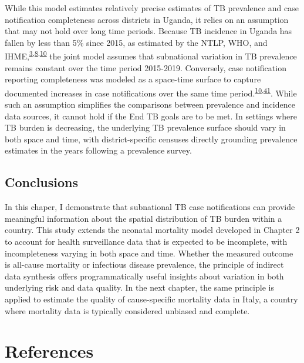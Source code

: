 \documentclass[
]{article}
\begin{document}
While this model estimates relatively precise estimates of TB prevalence and case notification completeness across districts in Uganda, it relies on an assumption that may not hold over long time periods. Because TB incidence in Uganda has fallen by less than 5\% since 2015, as estimated by the NTLP, WHO, and IHME,\textsuperscript{\protect\hyperlink{ref-WorldHealthOrganization2019}{3},\protect\hyperlink{ref-Kyu2018}{8},\protect\hyperlink{ref-UgandaNationalTuberculosisandLeprosyProgramme2020}{10}} the joint model assumes that subnational variation in TB prevalence remains constant over the time period 2015-2019. Conversely, case notification reporting completeness was modeled as a space-time surface to capture documented increases in case notifications over the same time period.\textsuperscript{\protect\hyperlink{ref-UgandaNationalTuberculosisandLeprosyProgramme2020}{10},\protect\hyperlink{ref-UgandaNationalTuberculosisandLeprosyProgramme2017b}{41}}. While such an assumption simplifies the comparisons between prevalence and incidence data sources, it cannot hold if the End TB goals are to be met. In settings where TB burden is decreasing, the underlying TB prevalence surface should vary in both space and time, with district-specific censuses directly grounding prevalence estimates in the years following a prevalence survey.

\hypertarget{conclusions}{%
\subsection{Conclusions}\label{conclusions}}

In this chaper, I demonstrate that subnational TB case notifications can provide meaningful information about the spatial distribution of TB burden within a country. This study extends the neonatal mortality model developed in Chapter 2 to account for health surveillance data that is expected to be incomplete, with incompleteness varying in both space and time. Whether the measured outcome is all-cause mortality or infectious disease prevalence, the principle of indirect data synthesis offers programmatically useful insights about variation in both underlying risk and data quality. In the next chapter, the same principle is applied to estimate the quality of cause-specific mortality data in Italy, a country where mortality data is typically considered unbiased and complete.

\hypertarget{references}{%
\section{References}\label{references}}
\end{document}
